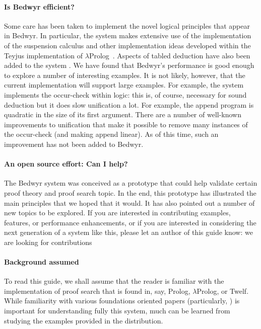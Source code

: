 \documentclass{article}
\newcommand{\lp}{$\lambda$Prolog}
\begin{document}
\paragraph{Is Bedwyr efficient?}
Some care has been taken to implement the novel logical principles
that appear in Bedwyr.  In particular, the system makes extensive use
of the implementation of the suspension calculus \cite{nadathur99jflp}
and other implementation ideas developed within the Teyjus
\cite{nadathur99cade} implementation of \lp\ \cite{nadathur88iclp}.
Aspects of tabled deduction have also been added to the system
\cite{ramakrishna97cav,pientka05cade}.  We have found that Bedwyr's
performance is good enough to explore a number of interesting
examples.  It is not likely, however, that the current implementation
will support large examples.  For example, the system implements the
occur-check within logic: this is, of course, necessary for sound
deduction but it does slow unification a lot.  For example, the append
program is quadratic in the size of its first argument.  There are a
number of well-known improvements to unification that make it possible
to remove many instances of the occur-check (and making append
linear).  As of this time, such an improvement has not been added to
Bedwyr.  

\paragraph{An open source effort: Can I help?}
The Bedwyr system was conceived as a prototype that could help
validate certain proof theory and proof search topic.  In the end,
this prototype has illustrated the main principles that we hoped that
it would.  It has also pointed out a number of new topics to be
explored.  If you are interested in contributing examples, features,
or performance enhancements, or if you are interested in considering
the next generation of a system like this, please let an author of
this guide know: we are looking for contributions

\paragraph{Background assumed}
To read this guide, we shall assume that the reader is familiar with
the implementation of proof search that is found in, say, Prolog, \lp,
or Twelf.  While familiarity with various foundations oriented papers
(particularly, \cite{mcdowell03tcs, miller05tocl,tiu04phd}) is
important for understanding fully this system, much can be learned
from studying the examples provided in the distribution.
\end{document}
